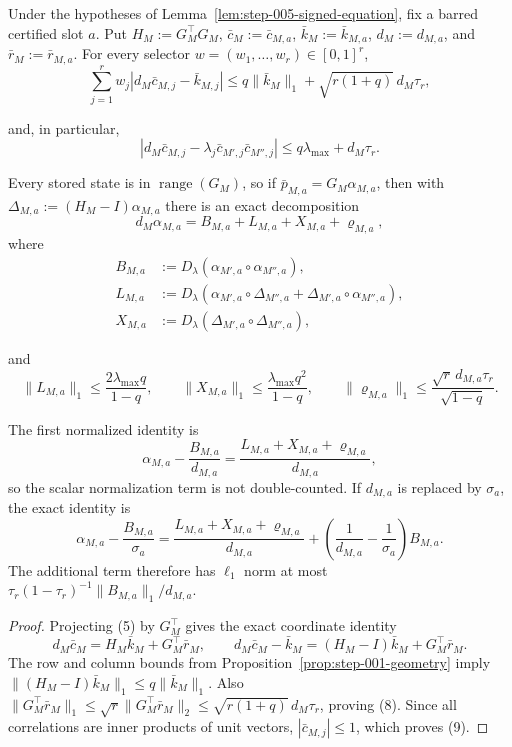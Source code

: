 \begin{proposition}\label{prop:step-005-projected-ledger}
Under the hypotheses of
Lemma~\ref{lem:step-005-signed-equation}, fix a barred certified slot $a$.
Put $H_M:=G_M^\top G_M$, $\bar c_M:=\bar c_{M,a}$,
$\bar k_M:=\bar k_{M,a}$, $d_M:=d_{M,a}$, and
$\bar r_M:=\bar r_{M,a}$.  For every selector
$w=(w_1,\ldots,w_r)\in[0,1]^r$,
\[
\sum_{j=1}^r w_j
\left|d_M\bar c_{M,j}-\bar k_{M,j}\right|
\le q\|\bar k_M\|_1+\sqrt{r(1+q)}\,d_M\tau_r,
\tag{8}
\]

and, in particular,
\[
\left|d_M\bar c_{M,j}-\lambda_j\bar c_{M',j}\bar c_{M'',j}\right|
\le q\lambda_{\max}+d_M\tau_r.
\tag{9}
\]

Every stored state is in $\operatorname{range}(G_M)$, so if
$\bar p_{M,a}=G_M\alpha_{M,a}$, then with
$\Delta_{M,a}:=(H_M-I)\alpha_{M,a}$ there is an exact decomposition
\[
d_M\alpha_{M,a}
=B_{M,a}+L_{M,a}+X_{M,a}+\varrho_{M,a},
\tag{10}
\]
where
\[
\begin{aligned}
B_{M,a}&:=D_\lambda(\alpha_{M',a}\circ\alpha_{M'',a}),\\
L_{M,a}&:=D_\lambda(\alpha_{M',a}\circ\Delta_{M'',a}
 +\Delta_{M',a}\circ\alpha_{M'',a}),\\
X_{M,a}&:=D_\lambda(\Delta_{M',a}\circ\Delta_{M'',a}),
\end{aligned}
\]

and
\[
\|L_{M,a}\|_1\le\frac{2\lambda_{\max}q}{1-q},\qquad
\|X_{M,a}\|_1\le\frac{\lambda_{\max}q^2}{1-q},\qquad
\|\varrho_{M,a}\|_1
\le\frac{\sqrt r\,d_{M,a}\tau_r}{\sqrt{1-q}}.
\tag{11}
\]

The first normalized identity is
\[
\alpha_{M,a}-\frac{B_{M,a}}{d_{M,a}}
=\frac{L_{M,a}+X_{M,a}+\varrho_{M,a}}{d_{M,a}},
\tag{12}
\]
so the scalar normalization term is not double-counted.  If $d_{M,a}$ is
replaced by $\sigma_a$, the exact identity is
\[
\alpha_{M,a}-\frac{B_{M,a}}{\sigma_a}
 =\frac{L_{M,a}+X_{M,a}+\varrho_{M,a}}{d_{M,a}}
  +\left(\frac1{d_{M,a}}-\frac1{\sigma_a}\right)B_{M,a}.
\tag{12a}
\]
The additional term therefore has $\ell_1$ norm at most
$\tau_r(1-\tau_r)^{-1}\|B_{M,a}\|_1/d_{M,a}$.

\begin{proof}
Projecting (5) by $G_M^\top$ gives the exact
coordinate identity
\[
d_M\bar c_M=H_M\bar k_M+G_M^\top\bar r_M,
\qquad
d_M\bar c_M-\bar k_M=(H_M-I)\bar k_M+G_M^\top\bar r_M.
\tag{13}
\]
The row and column bounds from Proposition~\ref{prop:step-001-geometry} imply
$\|(H_M-I)\bar k_M\|_1\le q\|\bar k_M\|_1$.  Also
$\|G_M^\top\bar r_M\|_1\le\sqrt r\|G_M^\top\bar r_M\|_2
\le\sqrt{r(1+q)}\,d_M\tau_r$, proving (8).  Since all correlations are inner
products of unit vectors, $|\bar c_{M,j}|\le1$, which proves (9).


\end{proof}
\end{proposition}
